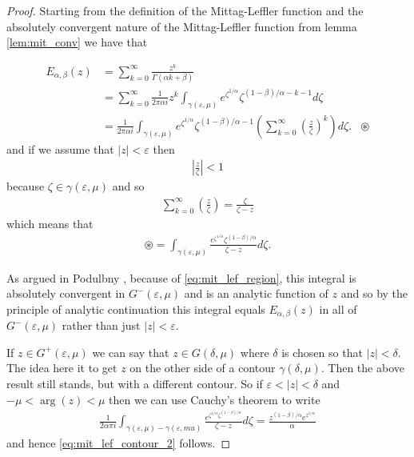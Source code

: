 \begin{proof}
    Starting from the definition of the Mittag-Leffler function and the absolutely convergent nature of the Mittag-Leffler function from lemma \ref{lem:mit_conv} we have that
    
    \begin{align}
	E_{\alpha, \beta}(z) &= \sum_{k=0}^\infty \frac{z^k}{\Gamma(\alpha k + \beta)} \\
	    &= \sum_{k=0}^\infty \frac{1}{2\pi\alpha i} z^k \int_{\gamma(\varepsilon, \mu)} e^{\zeta^{1 / \alpha}} \zeta^{(1-\beta)/\alpha - k - 1} d\zeta \\
	&= \frac{1}{2 \pi \alpha i}  \int_{\gamma(\varepsilon, \mu)} e^{\zeta^{1 / \alpha}} \zeta^{(1-\beta)/\alpha - 1} \left(\sum_{k=0}^\infty \left( \frac{z}{\zeta}\right)^k \right) d\zeta. & \circledast
   \end{align}
and if we assume that $ |z| < \varepsilon $ then
\begin{align}
    \left| \frac{z}{\zeta}\right| < 1
\end{align}
because $ \zeta \in \gamma(\varepsilon, \mu) $ and so
\begin{align}
   \sum_{k=0}^\infty \left( \frac{z}{\zeta} \right) = \frac{\zeta}{\zeta - z}
\end{align}
which means that
\begin{align}
    \circledast = \int_{\gamma(\varepsilon, \mu)} \frac{e^{\zeta^{1 / \alpha}}\zeta^{(1-\beta)/\alpha}}{\zeta - z} d\zeta.
\end{align}

As argued in Podulbny \cite{Podlubny1999}, because of \ref{eq:mit_lef_region}, this integral is absolutely convergent in $G^-(\varepsilon, \mu) $ and is an analytic function of $ z $ and so by the principle of analytic continuation this integral equals $ E_{\alpha, \beta}(z) $ in all of $ G^-(\varepsilon, \mu) $ rather than just $ |z| < \varepsilon $.

If $ z \in G^+(\varepsilon, \mu) $ we can say that $ z \in G(\delta, \mu) $ where $ \delta $ is chosen so that $ |z| < \delta $. The idea here it to get $ z $ on the other side of a contour $ \gamma(\delta, \mu) $.
Then the above result still stands, but with a different contour. So if $ \varepsilon < |z| <\delta $ and $ -\mu < \arg(z) < \mu $ then we can use Cauchy's theorem to write
\begin{align}
    \frac{1}{2\alpha \pi i} \int_{\gamma(\varepsilon, \mu) - \gamma(\varepsilon, mu)} \frac{e^{\zeta^{1 / \alpha} \zeta^{(1-\beta)/\alpha}}}{\zeta - z} d \zeta = \frac{z^{(1-\beta)/\alpha} e^{z^{1/\alpha}}}{\alpha}
\end{align}
and hence \ref{eq:mit_lef_contour_2} follows.
\end{proof}
